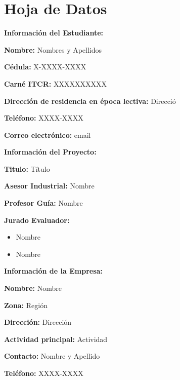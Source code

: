 \thispagestyle{plain}
\chapter*{Hoja de Datos}

\Large
\textbf{Información del Estudiante:}

\normalsize

\textbf{Nombre:} Nombres y Apellidos

\textbf{Cédula:} X-XXXX-XXXX

\textbf{Carné ITCR:} XXXXXXXXXX

\textbf{Dirección de residencia en época lectiva:} Direcció 

\textbf{Teléfono:} XXXX-XXXX

\textbf{Correo electrónico:} email

\vspace{1cm}

\Large
\textbf{Información del Proyecto:}
\normalsize

\textbf{Titulo:} Título

\textbf{Asesor Industrial:} Nombre

\textbf{Profesor Guía:} Nombre

\textbf{Jurado Evaluador:}
\begin{itemize}
    \item Nombre
    \item Nombre
\end{itemize}


\vspace{1cm}
\Large
\textbf{Información de la Empresa:}
\normalsize

\textbf{Nombre:} Nombre

\textbf{Zona:} Región

\textbf{Dirección:} Dirección

\textbf{Actividad principal:} Actividad

\textbf{Contacto:} Nombre y Apellido

\textbf{Teléfono:} XXXX-XXXX

